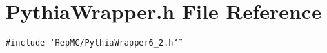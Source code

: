 \section{Pythia\-Wrapper.h File Reference}
\label{PythiaWrapper_8h}
{\tt \#include \char`\"{}Hep\-MC/Pythia\-Wrapper6\_\-2.h\char`\"{}}\par
